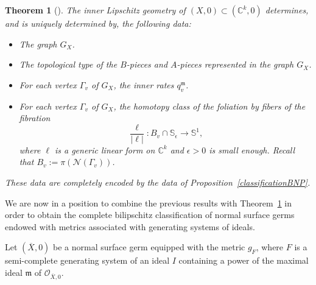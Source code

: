 \documentclass[reqno,dvipsnames,12pt]{amsart}
\newtheorem{thm}{Theorem}[section]
\begin{document}
\begin{thm}[{\cite[Theorem 7.5.30]{pichonintroduction}}]\label{laveritableclassificationbnp}
The inner Lipschitz geometry of $(X,0) \subset (\mathbb{C}^k,0)$ determines, and is uniquely determined by, the following data:
\begin{itemize}
    \item The graph $G_X$.
    \item The topological type of the $B$-pieces and $A$-pieces represented in the graph $G_X$.
    \item For each vertex $\Gamma_v$ of $G_X$, the inner rates $q_v^{\mathfrak{m}}$.
    \item For each vertex $\Gamma_v$ of $G_X$, the homotopy class of the foliation by fibers of the fibration 
    \[
    \frac{\ell}{|\ell|}: B_v \cap \mathbb{S}_{\epsilon} \longrightarrow \mathbb{S}^1,
    \] 
    where $\ell$ is a generic linear form on $\mathbb{C}^k$ and $\epsilon>0$ is small enough. Recall that $B_v := \pi(\mathcal{N}(\Gamma_v))$.
\end{itemize}
These data are completely encoded by the data of Proposition~\ref{classificationBNP}. 
\end{thm}
We are now in a position to combine the previous results with Theorem~\ref{laveritableclassificationbnp} in order to obtain the complete bilipschitz classification of normal surface germs endowed with metrics associated with generating systems of ideals.

Let $(\overline{X},0)$ be a normal surface germ equipped with the metric $g_F$, where $F$ is a semi-complete generating system of an ideal $I$ containing a power of the maximal ideal $\mathfrak{m}$ of $\mathcal{O}_{\overline{X},0}$.
\end{document}
